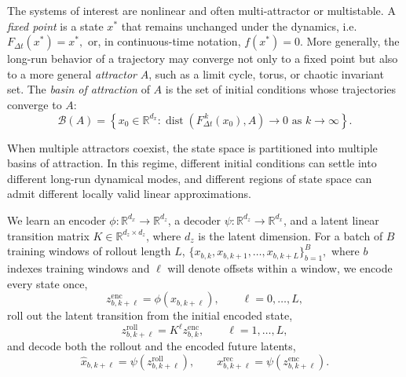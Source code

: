 \documentclass{article}
\begin{document}
The systems of interest are nonlinear and often multi-attractor or multistable. A \emph{fixed point} is a state \(x^\ast\) that remains unchanged under the dynamics, i.e. $F_{\Delta t}(x^\ast) = x^\ast,$ or, in continuous-time notation, \(f(x^\ast)=0\). More generally, the long-run behavior of a trajectory may converge not only to a fixed point but also to a
  more general \emph{attractor} \(A\), such as a limit cycle, torus, or chaotic invariant set. The \emph{basin of attraction} of \(A\) is the set of initial
  conditions whose trajectories converge to \(A\):
  \begin{equation}
      \mathcal{B}(A)
      =
      \left\{
          x_0 \in \mathbb{R}^{d_x}
          :
          \operatorname{dist}\!\left(F_{\Delta t}^{\,k}(x_0), A\right) \to 0
          \text{ as } k \to \infty
      \right\}.
  \end{equation}

When multiple attractors coexist, the state space is partitioned into multiple basins of attraction. In this regime, different initial conditions can settle into different long-run dynamical modes, and different regions of state space can admit different locally valid linear approximations. 
  


We learn an encoder $\phi : \mathbb{R}^{d_x} \rightarrow \mathbb{R}^{d_z}$, a decoder $\psi : \mathbb{R}^{d_z} \rightarrow \mathbb{R}^{d_x}$, and a latent linear transition matrix $K \in \mathbb{R}^{d_z \times d_z}$, where $d_z$ is the latent dimension. For a batch of $B$ training windows of rollout length $L$,
$\{x_{b,k}, x_{b,k+1}, \dots, x_{b,k+L}\}_{b=1}^{B},$
where $b$ indexes training windows and $\ell$ will denote offsets within a window,
we encode every state once,
\begin{equation}
    z_{b,k+\ell}^{\mathrm{enc}} = \phi(x_{b,k+\ell}), \qquad \ell = 0, \dots, L,
\end{equation}
roll out the latent transition from the initial encoded state,
\begin{equation}
    z_{b,k+\ell}^{\mathrm{roll}} = K^\ell z_{b,k}^{\mathrm{enc}}, \qquad \ell = 1, \dots, L,
\end{equation}
and decode both the rollout and the encoded future latents,
\begin{equation}
    \hat{x}_{b,k+\ell} = \psi(z_{b,k+\ell}^{\mathrm{roll}}), \qquad
    x_{b,k+\ell}^{\mathrm{rec}} = \psi(z_{b,k+\ell}^{\mathrm{enc}}).
\end{equation}
\end{document}
